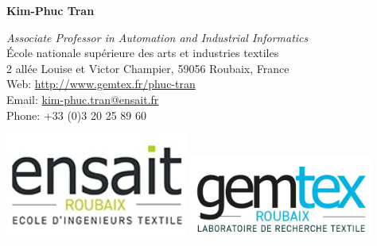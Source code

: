\documentclass[a4paper,11pt]{article}
\begin{document}
	
{\hspace*{-\marginparsep minus \marginparwidth} 
\begin{minipage}[t]{.6\textwidth+\marginparwidth+\marginparsep} 
{\Large \bfseries {Kim-Phuc Tran}} 

\vspace{0.2cm} 

\emph{Associate Professor in Automation and Industrial Informatics} \\
\'{E}cole nationale sup\'{e}rieure des arts et industries textiles \\
2 all\'{e}e Louise et Victor Champier, 59056 Roubaix, France \\
Web: \href{https://sites.google.com/view/kim-phuc-tran}{http://www.gemtex.fr/phuc-tran} \\
Email: \href{mailto:kim-phuc.tran@ensait.fr}{kim-phuc.tran@ensait.fr} \\
Phone: {\color{darkblue} +33 (0)3 20 25 89 60}
\end{minipage}
\begin{minipage}[t]{.2\textwidth+\marginparwidth+\marginparsep} 
\strut\vspace*{-1.25cm}\newline\includegraphics[width=0.45\textwidth,right]{ensait.jpg}
\newline\includegraphics[width=0.45\textwidth,right]{gemtex.jpg}
\end{minipage}
}

\vspace{0.5cm}
\end{document}
